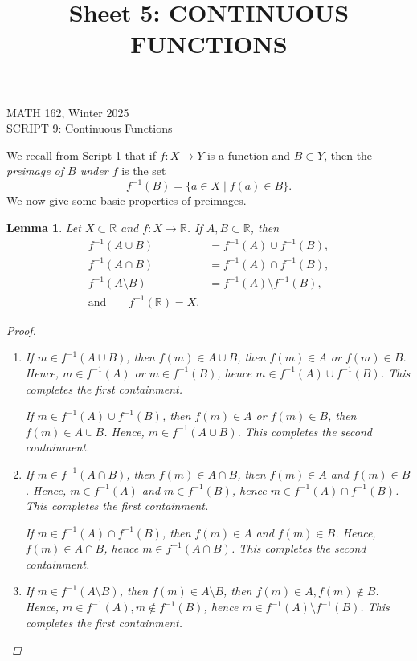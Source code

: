 \documentclass[11pt]{article}
\title{Sheet 5: CONTINUOUS FUNCTIONS }
\newcommand{\bbR}{\mathbb{R}}
\providecommand{\arr}{\to}
\providecommand{\sm}{\setminus}
\renewcommand{\_}[1]{\underline{ #1 }}
\newtheorem{lemma}[theorem]{Lemma}
\theoremstyle{definition}
\newcommand{\head}[1]{
	\begin{center}
		{\large #1}
		\vspace{.2 in}
	\end{center}
	
	\bigskip
}
\numberwithin{equation}{subsection}
\begin{document}
\head{MATH 162, Winter 2025\\
SCRIPT 9: Continuous Functions } 





\setcounter{section}{9}   





We recall from Script 1 that if $f \colon X \rightarrow Y$ is a function and $B \subset Y$, then the \emph{preimage of $B$ under $f$} is the set
\[
f^{-1}(B) = \{ a \in X \mid f(a) \in B \}.
\]
We now give some basic properties of preimages.
\begin{lemma}
Let $X\subset \bbR$ and $f\colon X\arr \bbR$.
If $A, B \subset \bbR$,  then
\begin{align*}
f^{-1}(A\cup B) &= f^{-1}(A) \cup f^{-1}(B),\\
f^{-1}(A\cap B) &= f^{-1}(A) \cap f^{-1}(B),\\
 f^{-1}(A\sm B) & = f^{-1}(A)\sm f^{-1}(B),\\
 \text{and}\qquad f^{-1}(\bbR)=X.
\end{align*}

\begin{proof}
\begin{enumerate}

\item If $m \in f^{-1}(A\cup B)$, then $f(m) \in A \cup B$, then $f(m)\in A$ or $f(m) \in B$. Hence, $m \in f^{-1}(A)$ or $m \in f^{-1}(B)$, hence $m \in f^{-1}(A) \cup f^{-1}(B)$. This completes the first containment.

If $m \in f^{-1}(A) \cup f^{-1}(B)$, then $f(m) \in A$ or $f(m) \in B$, then $f(m)\in A \cup B$. Hence, $m \in f^{-1}(A\cup B)$. This completes the second containment.

\item If $m\in f^{-1}(A\cap B)$, then $f(m) \in A \cap B$, then $f(m) \in A$ and $f(m) \in B$. Hence, $m \in f^{-1}(A)$ and $m \in f^{-1}(B)$, hence $m \in f^{-1}(A) \cap f^{-1}(B)$. This completes the first containment.

If $m \in f^{-1}(A) \cap f^{-1}(B)$, then $f(m) \in A$ and $f(m) \in B$. Hence, $f(m) \in A \cap B$, hence $m \in f^{-1}(A \cap B)$. This completes the second containment.

\item If $m \in f^{-1}(A \sm B)$, then $f(m) \in A \sm B$, then $f(m) \in A, f(m) \notin B$. Hence, $m \in f^{-1}(A), m \notin f^{-1}(B)$, hence $m \in f^{-1}(A) \sm f^{-1}(B)$. This completes the first containment.


\end{enumerate}
\end{proof}
\end{lemma}
\end{document}
